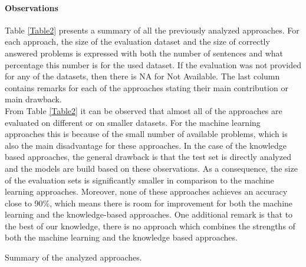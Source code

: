 \paragraph{Observations} 
Table \ref{Table2} presents a summary of all the previously analyzed approaches. For each approach, the size of the evaluation dataset and the size of correctly answered problems is expressed with both the number of sentences and what percentage this number is for the used dataset. If the evaluation was not provided for any of the datasets, then there is NA for Not Available. The last column contains remarks for each of the approaches stating their main contribution or main drawback. \\ 
From Table \ref{Table2} it can be observed that almost all of the approaches are evaluated on different or on smaller datasets. 
For the machine learning approaches this is because of the small number of available problems, which is also the main disadvantage for these approaches. 
In the case of the knowledge based approaches, the general drawback is that the test set is directly analyzed and the models are build based on these observations. As a consequence, the size of the evaluation sets is significantly smaller in comparison to the machine learning approaches. Moreover, none of these approaches achieves an accuracy close to 90\%, which means there is room for improvement for both the machine learning and the knowledge-based approaches. One additional remark is that to the best of our knowledge, there is no approach which combines the strengths of both the machine learning and the knowledge based approaches. \\


\begin{table}[h!]
	\centering
	
	\caption{{\label{Table2}}Summary of the analyzed approaches.}
\end{table}
